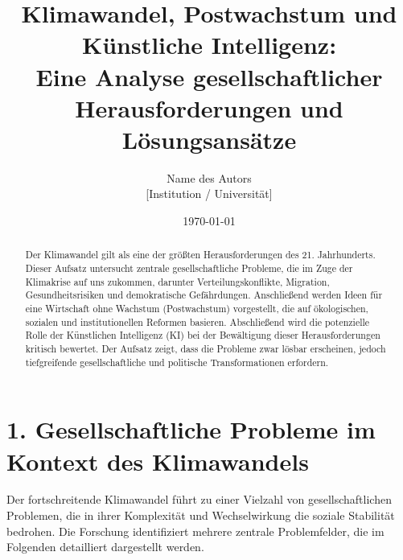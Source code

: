 \documentclass[12pt, a4paper]{article}
\title{
	\vspace{2cm}
	Klimawandel, Postwachstum und Künstliche Intelligenz: \\
	Eine Analyse gesellschaftlicher Herausforderungen und Lösungsansätze
}
\author{
	\vspace{0.5cm}
	\Large Name des Autors \\
	\normalsize [Institution / Universität] \\
	\vspace{0.5cm}
}
\date{\today}
\begin{document}
	
	\maketitle
	
	\vspace{0.5cm}
	\begin{abstract}
		\noindent
		Der Klimawandel gilt als eine der größten Herausforderungen des 21. Jahrhunderts.
		Dieser Aufsatz untersucht zentrale gesellschaftliche Probleme, die im Zuge der
		Klimakrise auf uns zukommen, darunter Verteilungskonflikte, Migration,
		Gesundheitsrisiken und demokratische Gefährdungen.
		Anschließend werden Ideen für eine
		Wirtschaft ohne Wachstum (Postwachstum) vorgestellt, die auf ökologischen,
		sozialen und institutionellen Reformen basieren.
		Abschließend wird die potenzielle
		Rolle der Künstlichen Intelligenz (KI) bei der Bewältigung dieser Herausforderungen
		kritisch bewertet.
		Der Aufsatz zeigt, dass die Probleme zwar lösbar erscheinen,
		jedoch tiefgreifende gesellschaftliche und politische Transformationen erfordern.
	\end{abstract}
	\vspace{0.8cm}
	
	\section*{1. Gesellschaftliche Probleme im Kontext des Klimawandels}
	
	Der fortschreitende Klimawandel führt zu einer Vielzahl von gesellschaftlichen
	Problemen, die in ihrer Komplexität und Wechselwirkung die soziale Stabilität
	bedrohen.
	Die Forschung identifiziert mehrere zentrale Problemfelder, die im Folgenden
	detailliert dargestellt werden.
	
\end{document}
